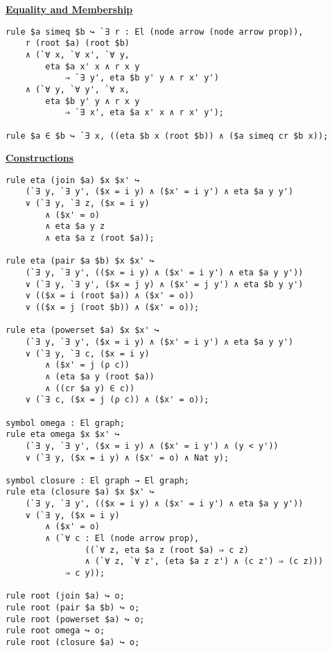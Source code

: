 \documentclass[submission,copyright,creativecommons]{eptcs}
\begin{document}
\begin{center}
\underline{\textbf{Equality and Membership}}
\end{center}

\begin{lstlisting}
rule $a simeq $b ↪ `∃ r : El (node arrow (node arrow prop)), 
    r (root $a) (root $b)
    ∧ (`∀ x, `∀ x', `∀ y, 
        eta $a x' x ∧ r x y
            ⇒ `∃ y', eta $b y' y ∧ r x' y')
    ∧ (`∀ y, `∀ y', `∀ x, 
        eta $b y' y ∧ r x y
            ⇒ `∃ x', eta $a x' x ∧ r x' y');

rule $a ∈ $b ↪ `∃ x, ((eta $b x (root $b)) ∧ ($a simeq cr $b x));
\end{lstlisting}

\begin{center}
\underline{\textbf{Constructions}}
\end{center}

\begin{lstlisting}
rule eta (join $a) $x $x' ↪ 
	(`∃ y, `∃ y', ($x = i y) ∧ ($x' = i y') ∧ eta $a y y')
    ∨ (`∃ y, `∃ z, ($x = i y) 
    	∧ ($x' = o) 
    	∧ eta $a y z 
    	∧ eta $a z (root $a));

rule eta (pair $a $b) $x $x' ↪ 
	(`∃ y, `∃ y', (($x = i y) ∧ ($x' = i y') ∧ eta $a y y'))
    ∨ (`∃ y, `∃ y', ($x = j y) ∧ ($x' = j y') ∧ eta $b y y')
    ∨ (($x = i (root $a)) ∧ ($x' = o))
    ∨ (($x = j (root $b)) ∧ ($x' = o));

rule eta (powerset $a) $x $x' ↪ 
	(`∃ y, `∃ y', ($x = i y) ∧ ($x' = i y') ∧ eta $a y y')
    ∨ (`∃ y, `∃ c, ($x = i y) 
    	∧ ($x' = j (ρ c)) 
    	∧ (eta $a y (root $a)) 
    	∧ ((cr $a y) ∈ c))
    ∨ (`∃ c, ($x = j (ρ c)) ∧ ($x' = o));

symbol omega : El graph;
rule eta omega $x $x' ↪ 
	(`∃ y, `∃ y', ($x = i y) ∧ ($x' = i y') ∧ (y < y'))
    ∨ (`∃ y, ($x = i y) ∧ ($x' = o) ∧ Nat y);

symbol closure : El graph → El graph;
rule eta (closure $a) $x $x' ↪ 
	(`∃ y, `∃ y', (($x = i y) ∧ ($x' = i y') ∧ eta $a y y'))
	∨ (`∃ y, ($x = i y) 
        ∧ ($x' = o)
        ∧ (`∀ c : El (node arrow prop), 
                ((`∀ z, eta $a z (root $a) ⇒ c z)
                ∧ (`∀ z, `∀ z', (eta $a z z') ∧ (c z') ⇒ (c z)))
            ⇒ c y));
            
rule root (join $a) ↪ o;
rule root (pair $a $b) ↪ o;
rule root (powerset $a) ↪ o;
rule root omega ↪ o;
rule root (closure $a) ↪ o;

\end{lstlisting}
\end{document}
